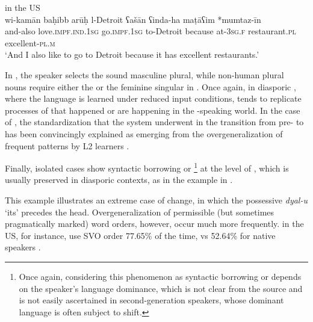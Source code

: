\documentclass[output=paper]{langsci/langscibook}
\begin{document}
\ea\label{ex:key:usa}
{  in the US \citep[740]{Albirini2014}}\\
\gll wi-kamān baḥibb arūḥ l-Detroit ʕašān ʕinda-ha maṭāʕim *mumtaz-īn\\
     and-also love.\textsc{impf.ind.1sg} go.\textsc{impf.1sg} to-Detroit because at-\textsc{3sg.f} restaurant.\textsc{pl} excellent-\textsc{pl.m}\\
\glt `And I also like to go to Detroit because it has excellent restaurants.'
\z

In , the speaker selects the sound masculine plural, while non-human plural nouns require either the  or the feminine singular in  . Once again,  in diasporic , where the language is learned under reduced input conditions, tends to replicate processes of  that happened or are happening in the -speaking world. In the case of , the standardization that the  system underwent in the transition from pre- to   has been convincingly explained as emerging from the overgeneralization of frequent patterns by L2 learners \citep{Belnap1999}.

Finally, isolated cases show syntactic borrowing or \footnote{Once again, considering this phenomenon as syntactic borrowing or  depends on the speaker’s language dominance, which is not clear from the source and is not easily ascertained in second-generation speakers, whose dominant language is often subject to shift.} at the level of , which is usually preserved in diasporic contexts, as in the example in .


This example illustrates an extreme case of  change, in which the possessive \textit{dyal-u} ‘its’ precedes the head. Overgeneralization of permissible (but sometimes pragmatically marked) word orders, however, occur much more frequently.   in the US, for instance, use SVO order 77.65\% of the time, vs 52.64\% for  native speakers \citep[280–281]{AlbiriniSaadah2011}.
\end{document}
